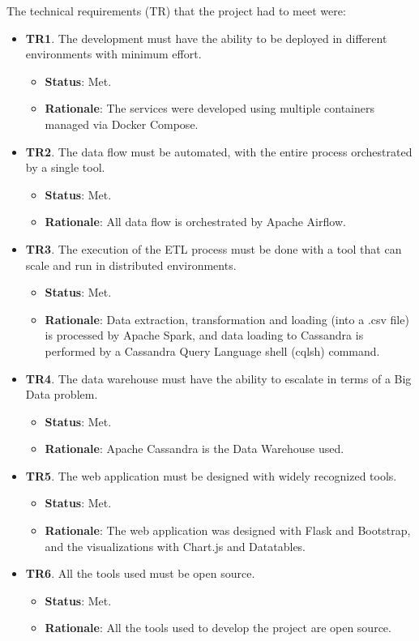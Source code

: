 \nonzeroparskip The technical requirements (TR) that the project had to meet were:
\begin{itemize}
	\item \textbf{TR1}. The development must have the ability to be deployed in different environments with minimum effort.
	\begin{itemize}
		\item \textbf{Status}: Met.
		\item \textbf{Rationale}: The services were developed using multiple containers managed via Docker Compose.
	\end{itemize}
	\item \textbf{TR2}. The data flow must be automated, with the entire process orchestrated by a single tool.
	\begin{itemize}
		\item \textbf{Status}: Met.
		\item \textbf{Rationale}: All data flow is orchestrated by Apache Airflow.
	\end{itemize}
	\item \textbf{TR3}. The execution of the ETL process must be done with a tool that can scale and run in distributed environments.
	\begin{itemize}
		\item \textbf{Status}: Met.
		\item \textbf{Rationale}: Data extraction, transformation and loading (into a .csv file) is processed by Apache Spark, and data loading to Cassandra is performed by a Cassandra Query Language shell (cqlsh) command.
	\end{itemize}
	\item \textbf{TR4}. The data warehouse must have the ability to escalate in terms of a Big Data problem.
	\begin{itemize}
		\item \textbf{Status}: Met.
		\item \textbf{Rationale}: Apache Cassandra is the Data Warehouse used.
	\end{itemize}
	\item \textbf{TR5}. The web application must be designed with widely recognized tools.
	\begin{itemize}
		\item \textbf{Status}: Met.
		\item \textbf{Rationale}: The web application was designed with Flask and Bootstrap, and the visualizations with Chart.js and Datatables.
	\end{itemize}
	\item \textbf{TR6}. All the tools used must be open source.
	\begin{itemize}
		\item \textbf{Status}: Met.
		\item \textbf{Rationale}: All the tools used to develop the project are open source.
	\end{itemize}
\end{itemize}